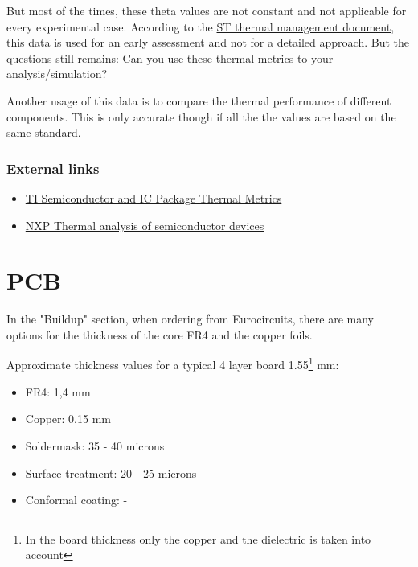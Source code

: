 \documentclass[final]{cubedoc}
\begin{document}
	But most of the times, these theta values are not constant and not applicable for every experimental case. According to the \href{https://web.archive.org/web/20200818184640/https://www.st.com/resource/en/application_note/dm00395696-thermal-management-guidelines-for-stm32-applications-stmicroelectronics.pdf}{ST thermal management document}, this data is used for an early assessment and not for a detailed approach. But the questions still remains: Can you use these thermal metrics to your analysis/simulation?
	
	Another usage of this data is to compare the thermal performance of different components. This is only accurate though if all the the values are based on the same standard.
	
	\subsubsection{External links}
	\begin{itemize}
		\item \href{https://web.archive.org/web/20200818132243/https://www.ti.com/lit/an/spra953c/spra953c.pdf}{TI Semiconductor and IC Package Thermal Metrics}
		\item \href{https://web.archive.org/web/20200818123847/https://www.nxp.com/docs/en/white-paper/BasicThermalWP.pdf}{NXP Thermal analysis of semiconductor devices}
	\end{itemize}
	
	
	\section{PCB}
	
	In the "Buildup" section, when ordering from Eurocircuits, there are many options for the thickness of the core FR4 and the copper foils.
	
	Approximate thickness values for a typical 4 layer board 1.55\footnote{In the board thickness only the copper and the dielectric is taken into account} mm:
	\begin{itemize}
		\item FR4:  1,4 mm
		\item Copper:  0,15 mm
		\item Soldermask: 35 - 40 microns
		\item Surface treatment: 20 - 25 microns
		\item Conformal coating: -
	\end{itemize}
	
\end{document}
